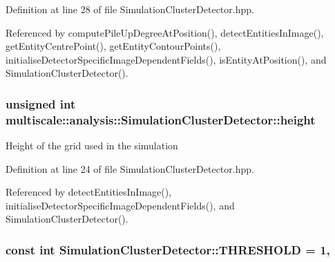 Definition at line 28 of file Simulation\-Cluster\-Detector.\-hpp.



Referenced by compute\-Pile\-Up\-Degree\-At\-Position(), detect\-Entities\-In\-Image(), get\-Entity\-Centre\-Point(), get\-Entity\-Contour\-Points(), initialise\-Detector\-Specific\-Image\-Dependent\-Fields(), is\-Entity\-At\-Position(), and Simulation\-Cluster\-Detector().

\hypertarget{classmultiscale_1_1analysis_1_1SimulationClusterDetector_a9d0a0fe5d9ea0f2516d07bf44b1da257}{
\subsubsection[{height}]{\setlength{\rightskip}{0pt plus 5cm}unsigned int multiscale\-::analysis\-::\-Simulation\-Cluster\-Detector\-::height\hspace{0.3cm}{\ttfamily [private]}}}\label{classmultiscale_1_1analysis_1_1SimulationClusterDetector_a9d0a0fe5d9ea0f2516d07bf44b1da257}
Height of the grid used in the simulation 

Definition at line 24 of file Simulation\-Cluster\-Detector.\-hpp.



Referenced by detect\-Entities\-In\-Image(), initialise\-Detector\-Specific\-Image\-Dependent\-Fields(), and Simulation\-Cluster\-Detector().

\hypertarget{classmultiscale_1_1analysis_1_1SimulationClusterDetector_a460525b4359afb52b4bde2ebd600122c}{
\subsubsection[{T\-H\-R\-E\-S\-H\-O\-L\-D}]{\setlength{\rightskip}{0pt plus 5cm}const int Simulation\-Cluster\-Detector\-::\-T\-H\-R\-E\-S\-H\-O\-L\-D = 1\hspace{0.3cm}{\ttfamily [static]}, {\ttfamily [private]}}}\label{classmultiscale_1_1analysis_1_1SimulationClusterDetector_a460525b4359afb52b4bde2ebd600122c}


